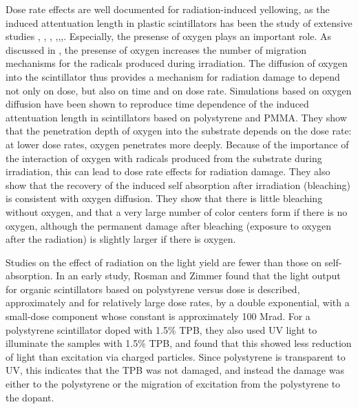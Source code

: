 \documentclass[review]{elsarticle}
\begin{document}
Dose rate effects are well documented for radiation-induced yellowing, as
the induced attentuation length in plastic scintillators has been the study of extensive studies \cite{34504}, \cite{Wick1991472}, \cite{289295},
\cite{173180},\cite{467829},\cite{Wulkop1995141},\cite{173178}.  Especially, the presense of oxygen plays an important role.  As discussed 
in \cite{Wulkop1995141}, the presense of oxygen
increases the number of migration mechanisms for the radicals produced during irradiation.  The diffusion of oxygen into the scintillator thus
provides a mechanism for radiation damage to depend not only on dose, but also on time and on dose rate.  Simulations based on oxygen diffusion have been shown
to reproduce time dependence of the induced attentuation length in scintillators based on polystyrene and PMMA\cite{Wick1991472}.  
They show that the penetration depth of oxygen into the substrate
depends on the dose rate: at lower dose rates, oxygen penetrates
more deeply.  Because of the importance of the interaction
of oxygen with radicals produced from the substrate during irradiation, this can lead to dose rate effects
for radiation damage.  They also show that the recovery of the
induced self absorption after irradiation (bleaching) is consistent with
oxygen diffusion.  They show that there is little bleaching
without oxygen, and that a very large number of color centers
form if there is no oxygen, although the permanent damage after
bleaching (exposure to oxygen after the radiation) is slightly
larger if there is oxygen.

Studies on the effect of radiation on the light yield are fewer
than those on self-absorption.
In an early study, Rosman and Zimmer\cite{rosmanzimmer} found that the light
output for organic scintillators based on polystyrene versus dose is described,
approximately and for relatively large dose rates, by a double exponential, 
with a small-dose component whose constant is approximately 100 Mrad.
For a polystyrene scintillator doped with 1.5\% TPB, they also used UV light to illuminate
the samples with 1.5\% TPB, and found that this showed less
reduction of light than excitation via charged particles.
Since polystyrene is transparent to UV, this
indicates that the TPB was not damaged, and instead the damage
was either to the polystyrene or the migration of excitation from the polystyrene
to the dopant.
\end{document}

